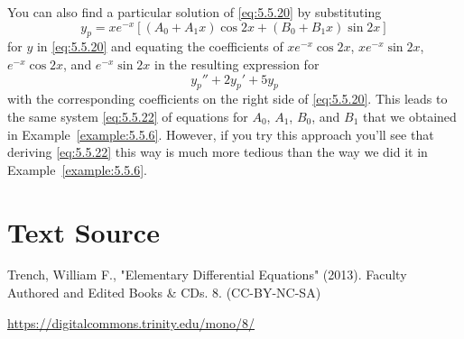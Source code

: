 \documentclass{ximera}
\begin{document}
You can also find a particular solution of \eqref{eq:5.5.20}
by substituting
$$
y_p=xe^{-x}\left[(A_0+A_1x)\cos 2x +(B_0+B_1x)\sin 2x\right]
$$
for $y$  in \eqref{eq:5.5.20}
and equating the  coefficients of $xe^{-x}\cos2x$,
$xe^{-x}\sin2x$, $e^{-x}\cos2x$, and $e^{-x}\sin2x$  in the
resulting expression for
$$
y_p''+2y_p'+5y_p
$$
with the corresponding coefficients on the right side of
\eqref{eq:5.5.20}. %
This leads to the
same system \eqref{eq:5.5.22} of equations for $A_0$, $A_1$, $B_0$, and
$B_1$ that we obtained in Example~\ref{example:5.5.6}. However, if you try
this approach you'll see that deriving \eqref{eq:5.5.22} this way is
much more tedious than the way we did it in Example~\ref{example:5.5.6}.
 
\section*{Text Source}
Trench, William F., "Elementary Differential Equations" (2013). Faculty Authored and Edited Books \& CDs. 8. (CC-BY-NC-SA)
 
\href{https://digitalcommons.trinity.edu/mono/8/}{https://digitalcommons.trinity.edu/mono/8/}
 
\end{document}
